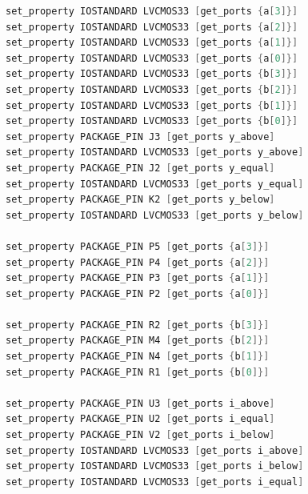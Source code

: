 \documentclass{article}
\begin{document}
\begin{lstlisting}[language=Verilog, caption={四位数值比较器的硬件验证约束文件}]
set_property IOSTANDARD LVCMOS33 [get_ports {a[3]}]
set_property IOSTANDARD LVCMOS33 [get_ports {a[2]}]
set_property IOSTANDARD LVCMOS33 [get_ports {a[1]}]
set_property IOSTANDARD LVCMOS33 [get_ports {a[0]}]
set_property IOSTANDARD LVCMOS33 [get_ports {b[3]}]
set_property IOSTANDARD LVCMOS33 [get_ports {b[2]}]
set_property IOSTANDARD LVCMOS33 [get_ports {b[1]}]
set_property IOSTANDARD LVCMOS33 [get_ports {b[0]}]
set_property PACKAGE_PIN J3 [get_ports y_above]
set_property IOSTANDARD LVCMOS33 [get_ports y_above]
set_property PACKAGE_PIN J2 [get_ports y_equal]
set_property IOSTANDARD LVCMOS33 [get_ports y_equal]
set_property PACKAGE_PIN K2 [get_ports y_below]
set_property IOSTANDARD LVCMOS33 [get_ports y_below]

set_property PACKAGE_PIN P5 [get_ports {a[3]}]
set_property PACKAGE_PIN P4 [get_ports {a[2]}]
set_property PACKAGE_PIN P3 [get_ports {a[1]}]
set_property PACKAGE_PIN P2 [get_ports {a[0]}]

set_property PACKAGE_PIN R2 [get_ports {b[3]}]
set_property PACKAGE_PIN M4 [get_ports {b[2]}]
set_property PACKAGE_PIN N4 [get_ports {b[1]}]
set_property PACKAGE_PIN R1 [get_ports {b[0]}]

set_property PACKAGE_PIN U3 [get_ports i_above]
set_property PACKAGE_PIN U2 [get_ports i_equal]
set_property PACKAGE_PIN V2 [get_ports i_below]
set_property IOSTANDARD LVCMOS33 [get_ports i_above]
set_property IOSTANDARD LVCMOS33 [get_ports i_below]
set_property IOSTANDARD LVCMOS33 [get_ports i_equal]
\end{lstlisting}
\end{document}
